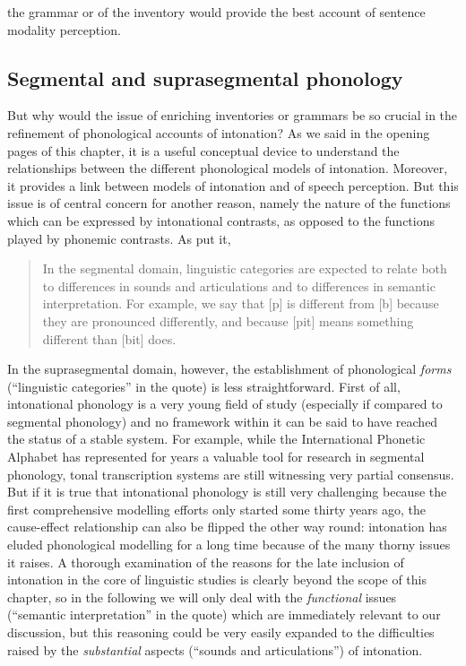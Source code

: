 the grammar or of the inventory would provide the best account of sentence modality perception.

\subsection{Segmental and suprasegmental phonology}\label{sec243}
But why would the issue of enriching inventories or grammars be so crucial in the refinement of phonological accounts of intonation? As we said in the opening pages of this chapter, it is a useful conceptual device to understand the relationships between the different phonological models of intonation. Moreover, it provides a link between models of intonation and of speech perception. But this issue is of central concern for another reason, namely the nature of the functions which can be expressed by intonational contrasts, as opposed to the functions played by phonemic contrasts. As \citeauthor{pierrehumbert1990meaning} put it, 
\begin{quote}
In the segmental domain, linguistic categories are expected to relate both to differences in sounds and articulations and to differences in semantic interpretation. For example, we say that [p] is different from [b] because they are pronounced differently, and because [pit] means something different than [bit] does. \cite[282]{pierrehumbert1990meaning}
\end{quote}
In the suprasegmental domain, however, the establishment of phonological \textit{forms} (``linguistic categories'' in the quote) is less straightforward. First of all, intonational phonology is a very young field of study (especially if compared to segmental phonology) and no framework within it can be said to have reached the status of a stable system. For example, while the International Phonetic Alphabet has represented for years a valuable tool for research in segmental phonology, tonal transcription systems are still witnessing very partial consensus. But if it is true that intonational phonology is still very challenging because the first comprehensive modelling efforts only started some thirty years ago, the cause-effect relationship can also be flipped the other way round: intonation has eluded phonological modelling for a long time because of the many thorny issues it raises. A thorough examination of the reasons for the late inclusion of intonation in the core of linguistic studies is clearly beyond the scope of this chapter, so in the following we will only deal with the \textit{functional} issues (``semantic interpretation'' in the quote) which are immediately relevant to our discussion, but this reasoning could be very easily expanded to the difficulties raised by the \textit{substantial} aspects (``sounds and articulations'') of intonation.

